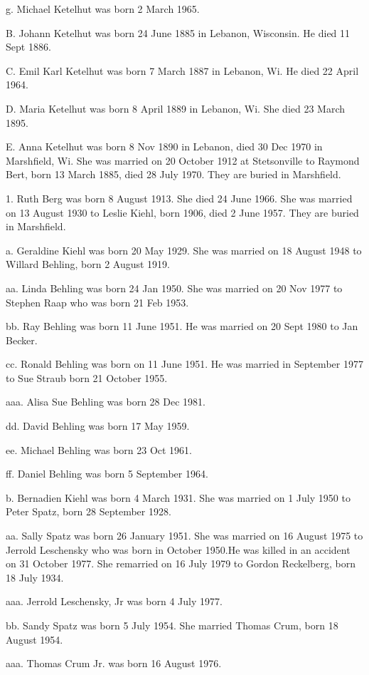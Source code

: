 \documentclass[a4paper]{article}
\begin{document}
g. Michael Ketelhut was born 2 March 1965.

B. Johann Ketelhut was born 24 June 1885 in Lebanon, Wisconsin.  He died 11 Sept 1886.

C.  Emil Karl Ketelhut was born 7 March 1887 in Lebanon, Wi.  He died 22 April 1964.

D. Maria Ketelhut was born 8 April 1889 in Lebanon, Wi.  She died 23 March 1895.

E. Anna Ketelhut was born 8 Nov 1890 in Lebanon, died 30 Dec 1970 in Marshfield, Wi. She was married on 20 October 1912 at Stetsonville to Raymond Bert, born 13 March 1885, died 28 July 1970.  They are buried in Marshfield.

1. Ruth Berg was born 8 August 1913.  She died 24 June 1966.  She was married on 13 August 1930 to Leslie Kiehl, born 1906, died 2 June 1957.  They are buried in Marshfield.

a. Geraldine Kiehl was born 20 May 1929.  She was married on 18 August 1948 to Willard Behling, born 2 August 1919.  

aa. Linda Behling was born 24 Jan 1950.  She was married on 20 Nov 1977 to Stephen Raap who was born 21 Feb 1953.

bb. Ray Behling was born 11 June 1951.  He was married on 20 Sept 1980 to Jan Becker.

cc. Ronald Behling was born on 11 June 1951.  He was married in September 1977 to Sue Straub born 21 October 1955.

aaa. Alisa Sue Behling was born 28 Dec 1981.

dd. David Behling was born 17 May 1959.

ee. Michael Behling was born 23 Oct 1961.

ff. Daniel Behling was born 5 September 1964.

b. Bernadien Kiehl was born 4 March 1931.   She was married on 1 July 1950 to Peter Spatz, born 28 September 1928.

aa. Sally Spatz was born 26 January 1951.  She was married on 16 August 1975 to Jerrold Leschensky who was born in October 1950.He was killed in an accident on 31 October 1977. She remarried	on 16 July 1979 to Gordon Reckelberg, born 18 July 1934.

aaa. Jerrold Leschensky, Jr was born 4 July 1977.

bb. Sandy Spatz was born 5 July 1954.  She married Thomas Crum, born 18 August 1954.

aaa. Thomas Crum Jr. was born 16 August 1976.
\end{document}
